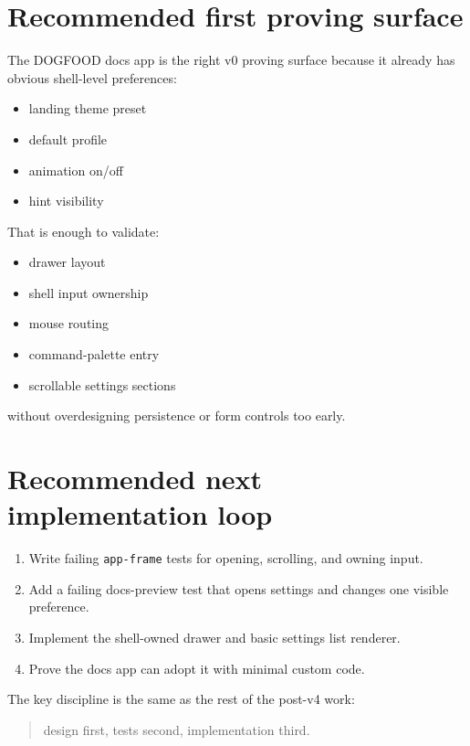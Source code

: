 \section{Recommended first proving surface}\label{record-057-recommended-first-proving-surface}

The DOGFOOD docs app is the right v0 proving surface because it already has obvious shell-level preferences:

\begin{itemize}
\tightlist
\item
  landing theme preset
\item
  default profile
\item
  animation on/off
\item
  hint visibility
\end{itemize}

That is enough to validate:

\begin{itemize}
\tightlist
\item
  drawer layout
\item
  shell input ownership
\item
  mouse routing
\item
  command-palette entry
\item
  scrollable settings sections
\end{itemize}

without overdesigning persistence or form controls too early.

\section{Recommended next implementation loop}\label{record-057-recommended-next-implementation-loop}

\begin{enumerate}
\def\labelenumi{\arabic{enumi}.}
\tightlist
\item
  Write failing \texttt{a\allowbreak{}p\allowbreak{}p\allowbreak{}-\allowbreak{}f\allowbreak{}r\allowbreak{}a\allowbreak{}m\allowbreak{}e} tests for opening, scrolling, and owning input.
\item
  Add a failing docs-preview test that opens settings and changes one visible preference.
\item
  Implement the shell-owned drawer and basic settings list renderer.
\item
  Prove the docs app can adopt it with minimal custom code.
\end{enumerate}

The key discipline is the same as the rest of the post-v4 work:

\begin{quote}
design first, tests second, implementation third.
\end{quote}

